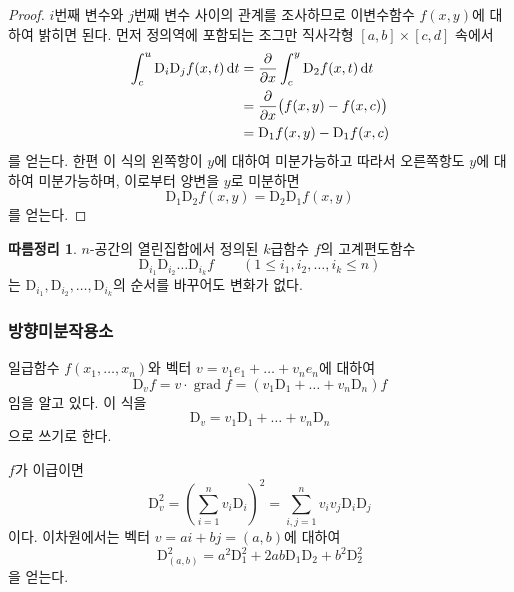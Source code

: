 \documentclass[unfonts,oneside,a4paper]{oblivoir}
\theoremstyle{definition}
\theoremstyle{theorem}
\newtheorem{corollary}{따름정리}[subsubsection]
\renewcommand{\vec}[1]{\bm{\mathit{#1}}}
\newcommand{\dd}{\mathrm{d}}
\newcommand{\dD}{\mathrm{D}}
\DeclareMathOperator{\grad}{grad}
\begin{document}
\begin{proof}
    $i$번째 변수와 $j$번째 변수 사이의 관계를 조사하므로 이변수함수 $f(x, y)$에 대하여 밝히면 된다.
    먼저 정의역에 포함되는 조그만 직사각형 $[a, b] \times [c, d]$ 속에서
    \begin{align*}
        \int_c^u \dD_i \dD_j f(x, t)\,\dd t &= \diffp*{\int_c^y \dD_2 f(x, t)\, \dd t}{x}\\
                                            &= \diffp*{\bigl(f(x, y) - f(x, c)\bigr)}{x}\\
                                            &= \dD_1 f(x, y) - \dD_1 f(x, c)
    \end{align*}
    를 얻는다.
    한편 이 식의 왼쪽항이 $y$에 대하여 미분가능하고 따라서 오른쪽항도 $y$에 대하여 미분가능하며, 이로부터 양변을 $y$로 미분하면
    \begin{equation*}
        \dD_1 \dD_2 f(x, y) = \dD_2 \dD_1 f(x, y)
    \end{equation*}
    를 얻는다.
\end{proof}

\begin{corollary}
    $n$-공간의 열린집합에서 정의된 $k$급함수 $f$의 고계편도함수
    \begin{equation*}
        \dD_{i_1} \dD_{i_2} \dots \dD_{i_k} f \qquad (1 \leq i_1, i_2, \dots, i_k \leq n)
    \end{equation*}
    는 $\dD_{i_1}, \dD_{i_2}, \dots, \dD_{i_k}$의 순서를 바꾸어도 변화가 없다.
\end{corollary}

\subsubsection{방향미분작용소}
일급함수 $f(x_1, \dots, x_n)$와 벡터 $\vec v = v_1 \vec e_1 + \dots + v_n \vec e_n$에 대하여
\begin{equation*}
    \dD_{\vec v} f = \vec v \cdot \grad f = (v_1 \dD_1 + \dots + v_n \dD_n) f
\end{equation*}
임을 알고 있다.
이 식을
\begin{equation*}
    \dD_{\vec v} = v_1 \dD_1 + \dots + v_n \dD_n
\end{equation*}
으로 쓰기로 한다.

$f$가 이급이면
\begin{equation*}
    \dD_{\vec v}^2 = \left(\sum_{i = 1}^n v_i \dD_i \right)^2 = \sum_{i, j = 1}^n v_i v_j \dD_i \dD_j
\end{equation*}
이다.
이차원에서는 벡터 $\vec v = a \vec i + b \vec j = (a, b)$에 대하여
\begin{equation*}
    \dD_{(a, b)}^2 = a^2 \dD_1^2 + 2ab \dD_1 \dD_2 + b^2 \dD_2^2
\end{equation*}
을 얻는다.
\end{document}
